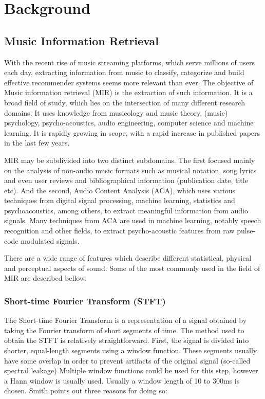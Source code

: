 \documentclass[a4paper, 12pt, twoside]{report}
\begin{document}
\newpage

\chapter{Background}
\label{sec:org4d1b31d}
\section{Music Information Retrieval}
\label{sec:orge32af72}

With the recent rise of music streaming platforms, which serve millions of users each day, extracting information from music to classify, categorize and build effective recommender systems seems more relevant than ever.
The objective of Music information retrieval (MIR) is the extraction of such information. It is a broad field of study, which lies on the intersection of many different research domains. It uses knowledge from musicology and music theory, (music) psychology, psycho-acoustics, audio engineering, computer science and machine learning. It is rapidly growing in scope, with a rapid increase in published papers in the last few years.

MIR may be subdivided into two distinct subdomains. The first focused mainly on the analysis of non-audio music formats such as musical notation, song lyrics and even user reviews and bibliographical information (publication date, title etc). And the second, Audio Content Analysis (ACA), which uses various techniques from digital signal processing, machine learning, statistics and psychoacoustics, among others, to extract meaningful information from audio signals. Many techniques from ACA are used in machine learning, notably speech recognition and other fields, to extract psycho-acoustic features from raw pulse-code modulated signals.

There are a wide range of features which describe different statistical, physical and perceptual aspects of sound. Some of the most commonly used in the field of MIR are described bellow.

\subsection{Short-time Fourier Transform (STFT)}
\label{sec:org5ad94c1}
The Short-time Fourier Transform is a representation of a signal obtained by taking the Fourier transform of short segments of time. The method used to obtain the STFT is relatively straightforward. First, the signal is divided into shorter, equal-length segments using a window function. These segments usually have some overlap in order to prevent artifacts of the original signal (so-called spectral leakage) Multiple window functions could be used for this step, however a Hann window is usually used. Usually a window length of 10 to 300ms is chosen. Smith \cite{book} points out three reasons for doing so:
\end{document}
